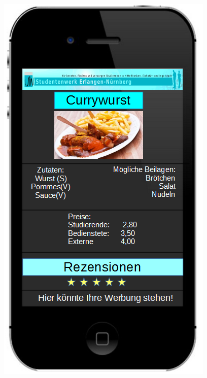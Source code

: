 \begin {itemize}
        \includegraphics[scale=0.4]{./inc/aufgabe05/MockupGericht.png}
\end{itemize}
        

    
